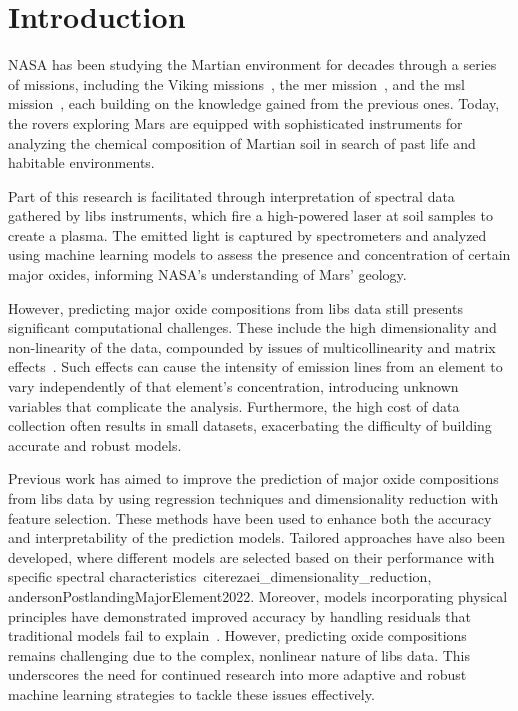 \section{Introduction}\label{sec:introduction}
NASA has been studying the Martian environment for decades through a series of missions, including the Viking missions~\cite{marsnasagov_vikings}, the \gls{mer} mission~\cite{marsnasagov_observer, marsnasagov_spirit_opportunity}, and the \gls{msl} mission~\cite{marsnasagov_msl}, each building on the knowledge gained from the previous ones.
Today, the rovers exploring Mars are equipped with sophisticated instruments for analyzing the chemical composition of Martian soil in search of past life and habitable environments.

Part of this research is facilitated through interpretation of spectral data gathered by \gls{libs} instruments, which fire a high-powered laser at soil samples to create a plasma.
The emitted light is captured by spectrometers and analyzed using machine learning models to assess the presence and concentration of certain major oxides, informing NASA's understanding of Mars' geology.

However, predicting major oxide compositions from \gls{libs} data still presents significant computational challenges.
These include the high dimensionality and non-linearity of the data, compounded by issues of multicollinearity and matrix effects~\cite{andersonImprovedAccuracyQuantitative2017}.
Such effects can cause the intensity of emission lines from an element to vary independently of that element's concentration, introducing unknown variables that complicate the analysis.
Furthermore, the high cost of data collection often results in small datasets, exacerbating the difficulty of building accurate and robust models.

Previous work has aimed to improve the prediction of major oxide compositions from \gls{libs} data by using regression techniques and dimensionality reduction with feature selection.
These methods have been used to enhance both the accuracy and interpretability of the prediction models.
Tailored approaches have also been developed, where different models are selected based on their performance with specific spectral characteristics~cite{rezaei_dimensionality_reduction, andersonPostlandingMajorElement2022}.
Moreover, models incorporating physical principles have demonstrated improved accuracy by handling residuals that traditional models fail to explain~\cite{song_DF-K-ELM}.
However, predicting oxide compositions remains challenging due to the complex, nonlinear nature of \gls{libs} data.
This underscores the need for continued research into more adaptive and robust machine learning strategies to tackle these issues effectively.

